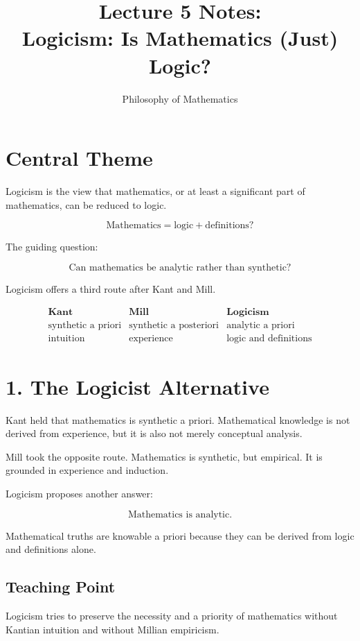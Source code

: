 \documentclass[11pt]{article}
\title{Lecture 5 Notes: \\ Logicism: Is Mathematics (Just) Logic?}
\author{Philosophy of Mathematics}
\date{}
\begin{document}
\maketitle

\section*{Central Theme}

Logicism is the view that mathematics, or at least a significant part of mathematics, can be
reduced to logic.

\[
\boxed{
\text{Mathematics} = \text{logic} + \text{definitions?}
}
\]

The guiding question:

\[
\boxed{
\text{Can mathematics be analytic rather than synthetic?}
}
\]

Logicism offers a third route after Kant and Mill.

\[
\begin{array}{c|c|c}
\textbf{Kant} & \textbf{Mill} & \textbf{Logicism} \\
\hline
\text{synthetic a priori} & \text{synthetic a posteriori} & \text{analytic a priori} \\
\text{intuition} & \text{experience} & \text{logic and definitions}
\end{array}
\]

\section*{1. The Logicist Alternative}

Kant held that mathematics is synthetic a priori. Mathematical knowledge is not derived
from experience, but it is also not merely conceptual analysis.

Mill took the opposite route. Mathematics is synthetic, but empirical. It is grounded in
experience and induction.

Logicism proposes another answer:

\[
\text{Mathematics is analytic.}
\]

Mathematical truths are knowable a priori because they can be derived from logic and
definitions alone.

\subsection*{Teaching Point}

Logicism tries to preserve the necessity and a priority of mathematics without Kantian
intuition and without Millian empiricism.
\end{document}
